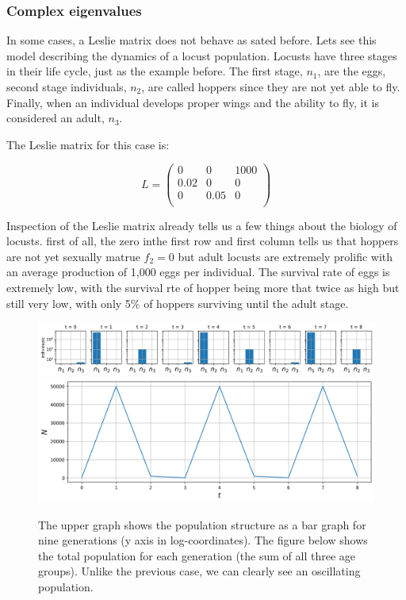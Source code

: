 \documentclass[12pt]{article}
\begin{document}
\subsubsection{Complex eigenvalues}

In some cases, a Leslie matrix does not behave as sated before. Lets see this model describing the dynamics of a locust population. Locusts have three stages in their life cycle, just as the example before. The first stage, $n_1$, are the eggs, second stage individuals, $n_2$, are called hoppers since they are not yet able to fly. Finally, when an individual develops proper wings and the ability to fly, it is considered an adult, $n_3$.

The Leslie matrix for this case is:

\begin{equation}
L=\begin{pmatrix}
	0	&0	&1000	\\
	0.02	&0	&0	\\
	0	&0.05	&0	\\
\end{pmatrix}
\end{equation}

Inspection of the Leslie matrix already tells us a few things about the biology of locusts. first of all, the zero inthe first row and first column tells us that hoppers are not yet sexually matrue $f_2=0$ but adult locusts are extremely prolific with an average production of 1,000 eggs per individual. The survival rate of eggs is extremely low, with the survival rte of hopper being more that twice as high but still very low, with only 5\% of hoppers surviving until the adult stage.

\begin{figure}
	\begin{center}
		\includegraphics[width=\textwidth]{locusts_evol}
		\includegraphics[width=\textwidth]{tot_locusts_evol}		
	\end{center}
	\caption{The upper graph shows the population structure as a bar graph for nine generations (y axis in log-coordinates). The figure below shows the total population for each generation (the sum of all three age groups). Unlike the previous case, we can clearly see an oscillating population.}
	\label{fig:Llocusts}
\end{figure}
\end{document}
